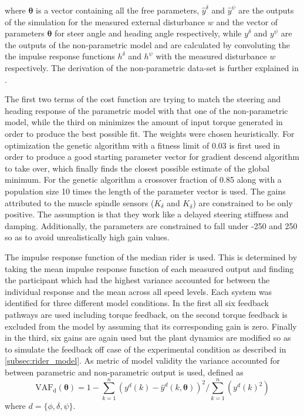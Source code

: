 where \ensuremath{\boldsymbol{\theta}} is a vector containing all the free parameters, \ensuremath{\hat{y}^{\delta}} and \ensuremath{\hat{y}^{\psi}} are the outputs of the simulation for the measured external disturbance \ensuremath{w} and the vector of parameters  \ensuremath{\boldsymbol{\theta}} for steer angle and heading angle respectively, while \ensuremath{y^\delta} and \ensuremath{y^\psi} are the outputs of the non-parametric model and are calculated by convoluting the the impulse response functions \ensuremath{h^\delta} and \ensuremath{h^\psi} with the measured disturbance \ensuremath{w} respectively. The derivation of the non-parametric data-set is further explained in \cite{dialynaseffect}.

The first two terms  of the cost function are trying to match the steering and heading  response of the parametric model with that one of the non-parametric model, while the third on minimizes the amount of input torque generated in order to produce the best possible fit. The weights were chosen heuristically. For optimization the genetic algorithm with a fitness limit of 0.03 is first  used in order to produce a good starting parameter vector for gradient descend algorithm to take over, which finally finds the closest possible estimate of the global minimum. For the genetic algorithm a crossover fraction of 0.85  along with a population size 10 times the length of the parameter vector is used. The gains attributed to the muscle spindle sensors (\ensuremath{K_\delta} and \ensuremath{K_{\dot{\delta}}}) are constrained to be only positive. The assumption is that they work like a delayed steering stiffness and damping. Additionally, the parameters are constrained to fall under -250 and 250 so as to avoid unrealistically high gain values. 

The impulse response function of the median rider is used. This is determined by taking the mean impulse response function of each measured output and finding the participant which had the highest variance accounted for between the individual response and the mean across all speed levels.
Each system was identified for three different model conditions. In the first all six feedback pathways are used including torque feedback, on the second torque feedback is excluded from the model by assuming that its corresponding gain is zero. Finally in the third, six gains are again used but the plant dynamics are modified so as to simulate the feedback off case of the experimental condition as described in \cref{subsec:rider_model}.  As metric of model validity the variance accounted for between parametric and non-parametric output is used, defined as
\begin{equation}
\mathrm{VAF_d}(\boldsymbol{\theta})=1 -\sum_{k=1}^{n}\left(y^{d}(k)-\hat{y}^{d}(k, \boldsymbol{\theta})\right)^{2} / \sum_{k=1}^{n}\left(y^{d}(k)^{2}\right)
\end{equation} 
where \ensuremath{d=\{\phi,\delta,\psi\}}. 

